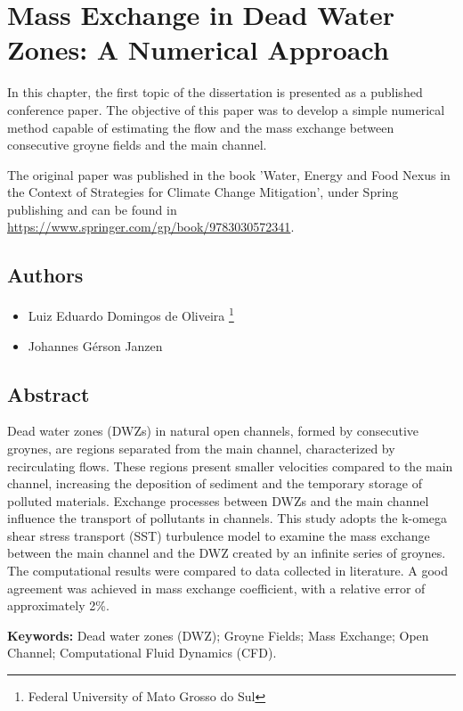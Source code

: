 \chapter{Mass Exchange in Dead Water Zones: A Numerical Approach}
\label{chap:art1}
In this chapter, the first topic of the dissertation is presented as a published conference paper. The objective of this paper was to develop a simple numerical method capable of estimating the flow and the mass exchange between consecutive groyne fields and the main channel.

The original paper was published in the book 'Water, Energy and Food Nexus in the Context of Strategies for Climate Change Mitigation', under Spring publishing and can be found in \url{https://www.springer.com/gp/book/9783030572341}.
\section*{Authors}
\begin{itemize}
    \item Luiz Eduardo Domingos de Oliveira \footnote[1]{Federal University of Mato Grosso do Sul}
    \item Johannes Gérson Janzen \footnotemark[1]
\end{itemize}
\section*{Abstract}
Dead water zones (DWZs) in natural open channels, formed by consecutive groynes, are regions separated from the main channel, characterized by recirculating flows. These regions present smaller velocities compared to the main channel, increasing the deposition of sediment and the temporary storage of polluted materials. Exchange processes between DWZs and the main channel influence the transport of pollutants in channels. This study adopts the k-omega shear stress transport (SST) turbulence model to examine the mass exchange between the main channel and the DWZ created by an infinite series of groynes. The computational results were compared to data collected in literature. A good agreement was achieved in mass exchange coefficient, with a relative error of approximately 2\%.

\noindent\textbf{Keywords:} Dead water zones (DWZ); Groyne Fields; Mass Exchange; Open Channel; Computational Fluid Dynamics (CFD).

